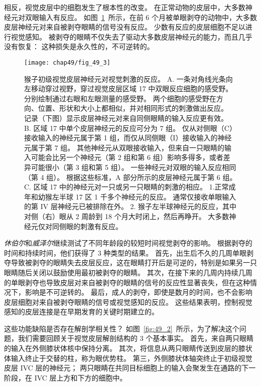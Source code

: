相反，视觉皮层中的细胞发生了根本性的改变。
在正常动物的皮层中，大多数神经元对双眼输入有反应。
如图~\ref{fig:49_3}~所示，在前 6 个月被单眼剥夺的动物中，大多数皮层神经元对来自被剥夺眼睛的信号没有反应。
少数有反应的皮层细胞不足以进行视觉感知。
被剥夺的眼睛不仅失去了驱动大多数皮层神经元的能力，而且几乎没有恢复：
这种损失是永久性的，不可逆转的。


\begin{figure}[htbp]
	\centering
	\texttt{[image: chap49/fig\_49\_3]}
	\caption{猴子初级视觉皮层神经元对视觉刺激的反应\cite{hubel1977ferrier}。
		A. 一条对角线光条向左移动穿过视野，穿过视觉皮层区域 17 中双眼反应细胞的感受野。
		分别绘制通过右眼和左眼测量的感受野。
		两个细胞的感受野在方向、位置、形状和大小上都相似，并对相同形式的刺激做出反应。
		记录（下图）显示皮层神经元对来自同侧眼睛的输入反应更有效。
		B. 区域 17 中单个皮层神经元的反应可分为 7 组。
		仅从对侧眼（C）接收输入的神经元属于第 1 组，而仅从同侧眼（I）接收输入的神经元属于第 7 组。
		其他神经元从双眼接收输入，但来自一只眼睛的输入可能会比另一个神经元（第 2 组和第 6 组）影响多得多，或者差异可能很小（第 3 组和第 5 组）。
		一些神经元对双眼的输入反应相同（第 4 组）。
		根据这些标准，A 部分所示的皮层神经元属于第 6 组。
		C. 区域 17 中的神经元对一只或另一只眼睛的刺激的相应。
		1.正常成年和幼猴左半球 17 区 1 千多个神经元的反应。
		通常仅接收单眼输入的第 IV 层神经元已被排除在外。
		2. 猴子左半球神经元的反应，其中对侧（右）眼从 2 周龄到 18 个月大时闭上，然后再睁开。
		大多数神经元仅对同侧眼的刺激有反应。}
	\label{fig:49_3}
\end{figure}


\textit{休伯尔}和\textit{威泽尔}继续测试了不同年龄段的较短时间视觉剥夺的影响。
根据剥夺的时间和持续时间，他们获得了 3 种类型的结果。
首先，出生后不久的几周单眼剥夺导致被剥夺的眼睛失去皮层反应，这在眼睛打开后是可逆的，特别是如果另一只眼睛随后关闭以鼓励使用最初被剥夺的眼睛。
其次，在接下来的几周内持续几周的单眼剥夺也导致皮层对来自被剥夺的眼睛的信号的反应性显著丧失，但在这种情况下，影响是不可逆转的。
最后，成人的剥夺，即使是数月的时间，也不会影响皮层细胞对来自被剥夺眼睛的信号或视觉感知的反应。
这些结果表明，控制视觉感知的皮层连接是在早期发育的关键时期建立的。


这些功能缺陷是否存在解剖学相关性？
如图~\ref{fig:49_2}~所示，为了解决这个问题，我们需要回顾关于视觉皮层解剖结构的 3 个基本事实。
首先，来自两只眼睛的输入在外侧膝状体核中保持分离。
其次，将信息从两只眼睛传送到皮层的膝状体输入终止于交替的柱，称为眼优势柱。
第三，外侧膝状体轴突终止于初级视觉皮层 IVC 层的神经元；
两只眼睛在共同目标细胞上的输入会聚发生在通路的下一阶段，在 IVC 层上方和下方的细胞中。


